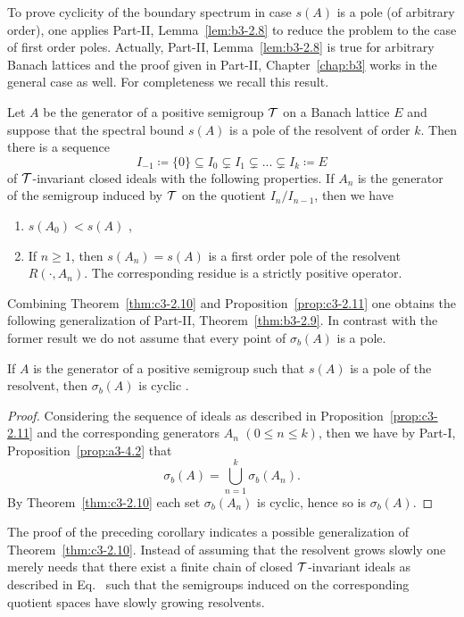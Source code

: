 To prove cyclicity of the boundary spectrum in case $s(A)$ is a pole (of arbitrary order), one applies Part-II, Lemma~\ref{lem:b3-2.8} to reduce the problem to the case of first order poles. 
Actually, Part-II, Lemma~\ref{lem:b3-2.8} is true for arbitrary Banach lattices and the proof given in Part-II, Chapter~\ref{chap:b3} works in the general case as well. 
For completeness we recall this result. 
\begin{proposition}\label{prop:c3-2.11}
	Let $A$ be the generator of a positive semigroup $\mathcal{T}$ on a Banach lattice $E$ and suppose that the spectral bound $s(A)$ is a pole of the resolvent%
    of order $k$.
	Then there is a sequence
	\begin{equation}\label{eq:c3-2.22}
		I_{-1} \coloneq \{0\} \subseteq I_{0} \subsetneq I_{1} \subsetneq ... \subsetneq I_{k} \coloneq E
	\end{equation}
	of\/ $\mathcal{T}$-invariant closed ideals with the following properties.
	If\/ $A_{n}$ is the generator of the semigroup induced by $\mathcal{T}$ on the quotient $I_{n}/I_{n-1}$, then we have
	\begin{enumerate}[\upshape (i)]
		\item 	
		$s(A_{0}) < s(A)$ , 

		\item 
		If\/ $n \geq 1$, then $s(A_{n}) = s(A)$ is a first order pole of the resolvent $R(\cdot,A_{n})$.
		The corresponding residue is a strictly positive operator.

	\end{enumerate}
\end{proposition}
Combining Theorem~\ref{thm:c3-2.10} and Proposition~\ref{prop:c3-2.11} one obtains the following generalization of Part-II, Theorem~\ref{thm:b3-2.9}.
In contrast with the former result we do not assume that every point of\/ $\sigma_{b}(A)$ is a pole.
\begin{corollary}\label{cor:c3-2.12}
	If\/ $A$ is the generator of a positive semigroup such that $s(A)$ is a pole of the resolvent, then $\sigma_{b}(A)$ is cyclic
    .
\end{corollary}
\begin{proof}
Considering the sequence of ideals as described in Proposition~\ref{prop:c3-2.11} and the corresponding generators $A_{n}$ $(0 \leq n \leq k)$, then we have by Part-I, Proposition~\ref{prop:a3-4.2} that 
%
\[
	\sigma_{b}(A) = \bigcup_{n=1}^{k} \sigma_{b}(A_{n}) .
\]
%
By Theorem~\ref{thm:c3-2.10} each set $\sigma_{b}(A_{n})$ is cyclic, hence so is $\sigma_{b}(A)$.
\end{proof}
The proof of the preceding corollary indicates a possible generalization of Theorem~\ref{thm:c3-2.10}.
Instead of assuming that the resolvent grows slowly one merely needs that there exist a finite chain of closed $\mathcal{T}$-invariant ideals as described in Eq.~ such that the semigroups induced on the corresponding quotient spaces have slowly growing resolvents.

